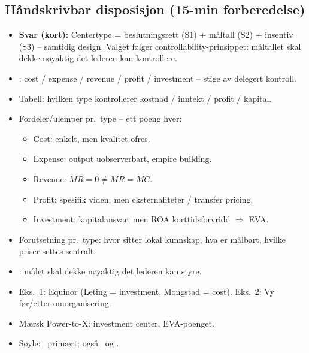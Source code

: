\subsection*{Håndskrivbar disposisjon (15-min forberedelse)}
\begin{itemize}\setlength{\itemsep}{2pt}
\item \textbf{Svar (kort):} Centertype = beslutningsrett (S1) + måltall (S2) + insentiv (S3) -- samtidig design. Valget følger controllability-prinsippet: måltallet skal dekke nøyaktig det lederen kan kontrollere.
\item {}: cost / expense / revenue / profit / investment -- stige av delegert kontroll.
\item Tabell: hvilken type kontrollerer kostnad / inntekt / profit / kapital.
\item Fordeler/ulemper pr.\ type -- ett poeng hver:
  \begin{itemize}
    \item Cost: enkelt, men kvalitet ofres.
    \item Expense: output uobserverbart, empire building.
    \item Revenue: $MR=0 \neq MR=MC$.
    \item Profit: spesifik viden, men eksternaliteter / transfer pricing.
    \item Investment: kapitalansvar, men ROA korttidsforvridd $\Rightarrow$ EVA.
  \end{itemize}
\item Forutsetning pr.\ type: hvor sitter lokal kunnskap, hva er målbart, hvilke priser settes sentralt.
\item {}: målet skal dekke nøyaktig det lederen kan styre.
\item Eks.\ 1: Equinor (Leting = investment, Mongstad = cost). Eks.\ 2: Vy før/etter omorganisering.
\item Mærsk Power-to-X: investment center, EVA-poenget.
\item Søyle: \STwo\ primært; også \SOne\ og \SThree.
\end{itemize}
